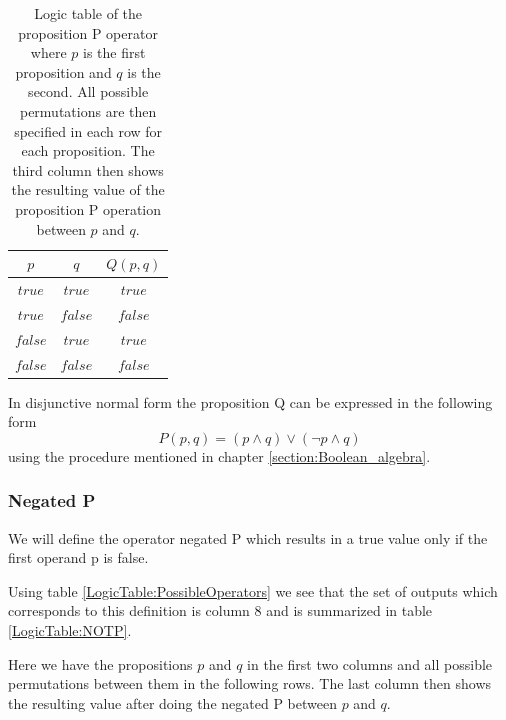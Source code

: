         \begin{table}[h!]
            \centering
            \begin{tabular}{|c|c|c|}
            	\hline
            	  $p$   &   $q$   & $Q(p, q)$ \\ \hline
            	$true$  & $true$  &  $true$   \\ \hline
            	$true$  & $false$ &  $false$  \\ \hline
            	$false$ & $true$  &  $true$   \\ \hline
            	$false$ & $false$ &  $false$  \\ \hline
            \end{tabular}
            \caption{Logic table of the proposition P operator where $p$ is the first proposition and $q$ is the second. All possible permutations are then specified in each row for each proposition. The third column then shows the resulting value of the proposition P operation between $p$ and $q$.}
            \label{LogicTable:Q}
        \end{table}
        
        In disjunctive normal form the proposition Q can be expressed in the following form
        \begin{equation}
            P(p, q) = (p \wedge q) \vee (\neg p \wedge  q)
        \end{equation}
        using the procedure mentioned in chapter \ref{section:Boolean_algebra}.
    
    \subsubsection{Negated P}
        We will define the operator negated P which results in a true value only if the first operand p is false.
        
        Using table \ref{LogicTable:PossibleOperators} we see that the set of outputs which corresponds to this definition is column 8 and is summarized in table \ref{LogicTable:NOTP}.
        
        Here we have the propositions $p$ and $q$ in the first two columns and all possible permutations between them in the following rows. The last column then shows the resulting value after doing the negated P between $p$ and $q$.
        
